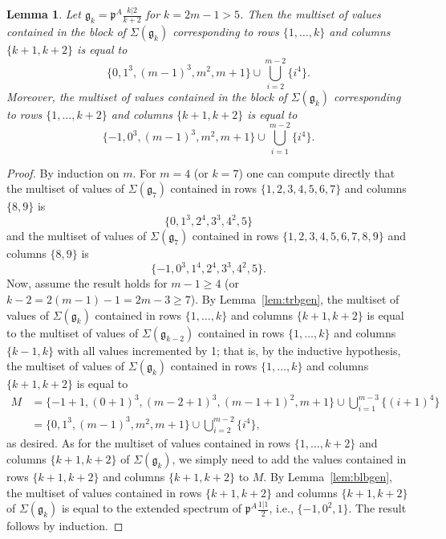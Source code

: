 \documentclass[letterpaper,10pt]{article}
\newtheorem{lemma}[theorem]{Lemma}
\begin{document}
\begin{lemma}\label{lem:blbbase2}
Let $\mathfrak{g}_k=\mathfrak{p}^A\frac{k|2}{k+2}$ for $k=2m-1>5$. Then the multiset of values contained in the block of $\Sigma(\mathfrak{g}_k)$ corresponding to rows $\{1,\hdots,k\}$ and columns $\{k+1,k+2\}$ is equal to $$\{0,1^3,(m-1)^3,m^2,m+1\}\cup\bigcup_{i=2}^{m-2}\{i^4\}.$$ Moreover, the multiset of values contained in the block of $\Sigma(\mathfrak{g}_k)$ corresponding to rows $\{1,\hdots,k+2\}$ and columns $\{k+1,k+2\}$ is equal to $$\{-1,0^3,(m-1)^3,m^2,m+1\}\cup\bigcup_{i=1}^{m-2}\{i^4\}.$$
\end{lemma}
\begin{proof}
By induction on $m$. For $m=4$ (or $k=7$) one can compute directly that the multiset of values of $\Sigma(\mathfrak{g}_7)$ contained in rows $\{1,2,3,4,5,6,7\}$ and columns $\{8,9\}$ is $$\{0,1^3,2^4,3^3,4^2,5\}$$ and the multiset of values of $\Sigma(\mathfrak{g}_7)$ contained in rows $\{1,2,3,4,5,6,7,8,9\}$ and columns $\{8,9\}$ is $$\{-1,0^3,1^4,2^4,3^3,4^2,5\}.$$ Now, assume the result holds for $m-1\ge 4$ (or $k-2=2(m-1)-1=2m-3\geq 7$). By Lemma~\ref{lem:trbgen}, the multiset of values of $\Sigma(\mathfrak{g}_k)$ contained in rows $\{1,\hdots,k\}$ and columns $\{k+1,k+2\}$ is equal to the multiset of values of $\Sigma(\mathfrak{g}_{k-2})$ contained in rows $\{1,\hdots,k\}$ and columns $\{k-1,k\}$ with all values incremented by 1; that is, by the inductive hypothesis, the multiset of values of $\Sigma(\mathfrak{g}_k)$ contained in rows $\{1,\hdots,k\}$ and columns $\{k+1,k+2\}$ is equal to
\begin{align*}
    M&=\{-1+1,(0+1)^3,(m-2+1)^3,(m-1+1)^2,m+1\}\cup\bigcup_{i=1}^{m-3}\{(i+1)^4\}\\
    &=\{0,1^3,(m-1)^3,m^2,m+1\}\cup\bigcup_{i=2}^{m-2}\{i^4\},
\end{align*}
as desired.
As for the multiset of values contained in rows $\{1,\hdots,k+2\}$ and columns $\{k+1,k+2\}$ of $\Sigma(\mathfrak{g}_k)$, we simply need to add the values contained in rows $\{k+1,k+2\}$ and columns $\{k+1,k+2\}$ to $M$. By Lemma~\ref{lem:blbgen}, the multiset of values contained in rows $\{k+1,k+2\}$ and columns $\{k+1,k+2\}$ of $\Sigma(\mathfrak{g}_k)$ is equal to the extended spectrum of $\mathfrak{p}^A\frac{1|1}{2}$, i.e., $\{-1,0^2,1\}$. The result follows by induction.
\end{proof}
\end{document}
